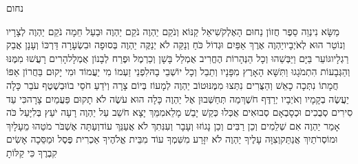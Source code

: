 \documentclass[../main/main.tex]{subfiles}
\begin{document}
\thispagestyle{empty}
\Incipit{}נחום
\cleardoublepage
\RTLmulticolcolumns
\begin{multicols*}{\ncols}
מַשָּׂא נִינְוֵה סֵפֶר חֲזוֹן נַחוּם הָאֶלְקֹשִׁי\PreVerseSpace{}אֵל קַנּוֹא וְנֹקֵם יַהְוֶה נֹקֵם יַהְוֶה וּבַעַל חֵמָה נֹקֵם יַהְוֶה לְצָרָיו וְנוֹטֵר הוּא לְאֹיְבָיו\PreVerseSpace{}יַהְוֶה אֶרֶךְ אַפַּיִם וּגְדוֹל כֹּחַ וְנַקֵּה לֹא יְנַקֶּה יַהְוֶה בְּסוּפָה וּבִשְׂעָרָה דַּרְכּוֹ וְעָנָן אֲבַק רַגְלָיו\PreVerseSpace{}גּוֹעֵר בַּיָּם וַיַּבְּשֵׁהוּ וְכָל הַנְּהָרוֹת הֶחֱרִיב אֻמְלַל בָּשָׁן וְכַרְמֶל וּפֶרַח לְבָנוֹן אֻמְלָל\PreVerseSpace{}הָרִים רָעֲשׁוּ מִמֶּנּוּ וְהַגְּבָעוֹת הִתְמֹגָגוּ וַתִּשָּׁא\SubEnd{} הָאָרֶץ מִפָּנָיו וְתֵבֵל וְכָל יוֹשְׁבֵי בָהּ\PreVerseSpace{}לִפְנֵי זַעְמוֹ מִי יַעֲמוֹד וּמִי יָקוּם בַּחֲרוֹן אַפּוֹ חֲמָתוֹ נִתְּכָה כָאֵשׁ וְהַצֻּרִים נִתְּצוּ מִמֶּנּוּ\PreVerseSpace{}טוֹב יַהְוֶה לְמָעוֹז בְּיוֹם צָרָה וְיֹדֵעַ חֹסֵי בוֹ\PreVerseSpace{}וּבְשֶׁטֶף עֹבֵר כָּלָה יַעֲשֶׂה בְקָמָיו\SubEnd{} וְאֹיְבָיו יְרַדֶּף חֹשֶׁךְ\PreVerseSpace{}מַה תְּחַשְּׁבוּן אֶל יַהְוֶה כָּלָה הוּא עֹשֶׂה לֹא תָקוּם פַּעֲמַיִם צָרָה\PreVerseSpace{}כִּי עַד סִירִים סְבֻכִים וּכְסָבְאָם סְבוּאִים אֻכְּלוּ כְּקַשׁ יָבֵשׁ מָלֵא\PreVerseSpace{}מִמֵּךְ יָצָא חֹשֵׁב עַל יַהְוֶה רָעָה יֹעֵץ בְּלִיָּעַל \ClosedSection{}כֹּה אָמַר יַהְוֶה אִם שְׁלֵמִים וְכֵן רַבִּים וְכֵן נָגוֹזּוּ וְעָבָר וְעִנִּתִךְ לֹא אֲעַנֵּךְ עוֹד\PreVerseSpace{}וְעַתָּה אֶשְׁבֹּר מֹטֵהוּ מֵעָלָיִךְ וּמוֹסְרֹתַיִךְ אֲנַתֵּק\PreVerseSpace{}וְצִוָּה עָלֶיךָ יַהְוֶה לֹא יִזָּרַע מִשִּׁמְךָ עוֹד מִבֵּית אֱלֹהֶיךָ אַכְרִית פֶּסֶל וּמַסֵּכָה אָשִׂים קִבְרֶךָ כִּי קַלּוֹתָ\OpenSection{}\par

\end{multicols*}
\end{document}
